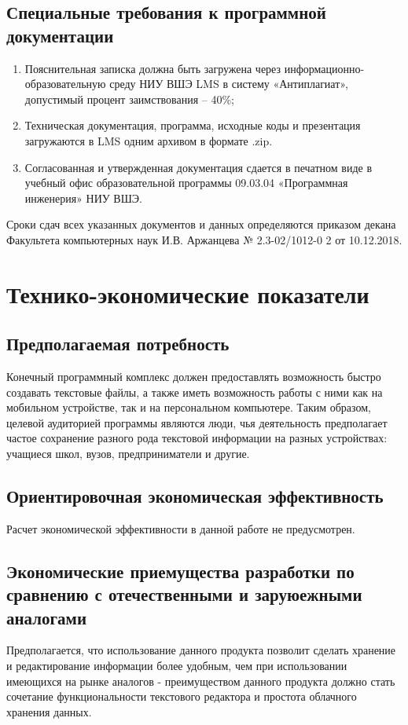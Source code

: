 ﻿\documentclass[techtask]{espd}
\begin{document}
\subsection{Специальные требования к программной документации}
\begin{enumerate}
\item Пояснительная записка должна быть загружена через информационно-образовательную среду НИУ ВШЭ LMS в систему «Антиплагиат», допустимый процент заимствования – 40\%;
\item Техническая документация, программа, исходные коды и презентация загружаются в LMS одним архивом в формате .zip.
\item Согласованная и утвержденная документация сдается в печатном виде в учебный офис образовательной программы 09.03.04 «Программная инженерия» НИУ ВШЭ.
\end{enumerate}

Сроки сдач всех указанных документов и данных определяются приказом декана Факультета компьютерных наук И.В. Аржанцева № 2.3-02/1012-0 2 от 10.12.2018. 

\section{Технико-экономические показатели}

\subsection{Предполагаемая потребность}
Конечный программный комплекс должен предоставлять возможность быстро создавать текстовые файлы, а также иметь возможность работы с ними как на мобильном устройстве, так и на персональном компьютере. Таким образом, целевой аудиторией программы являются люди, чья деятельность предполагает частое сохранение разного рода текстовой информации на разных устройствах: учащиеся школ, вузов, предприниматели и другие.

\subsection{Ориентировочная экономическая эффективность}
Расчет экономической эффективности в данной работе не предусмотрен.

\subsection{Экономические приемущества разработки по сравнению с отечественными и заруюежными аналогами}
Предполагается, что использование данного продукта позволит сделать хранение и редактирование информации более удобным, чем при использовании имеющихся на рынке аналогов - преимуществом данного продукта должно стать сочетание функциональности текстового редактора и простота облачного хранения данных.
\end{document}
